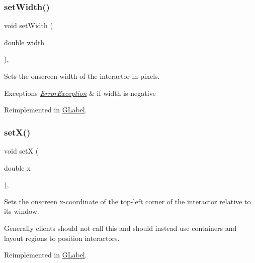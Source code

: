 \mbox{\label{classGInteractor_aa3f3fba4cb131baa8696ba01e3bceca1}} 
\subsubsection{\texorpdfstring{set\+Width()}{setWidth()}}
{\footnotesize\ttfamily void set\+Width (\begin{DoxyParamCaption}\item[{double}]{width }\end{DoxyParamCaption})\hspace{0.3cm}{\ttfamily [virtual]}, {\ttfamily [inherited]}}



Sets the onscreen width of the interactor in pixels. 


\begin{DoxyExceptions}{Exceptions}
{\em \mbox{\hyperlink{classErrorException}{Error\+Exception}}} & if width is negative \\
\hline
\end{DoxyExceptions}


Reimplemented in \mbox{\hyperlink{classGLabel_aca9b9c666c4162ab0a27a10530bc0762}{G\+Label}}.

\mbox{\label{classGInteractor_a9c18fcc579333bf9653d13ad2b372e39}} 
\subsubsection{\texorpdfstring{set\+X()}{setX()}}
{\footnotesize\ttfamily void setX (\begin{DoxyParamCaption}\item[{double}]{x }\end{DoxyParamCaption})\hspace{0.3cm}{\ttfamily [virtual]}, {\ttfamily [inherited]}}



Sets the onscreen x-\/coordinate of the top-\/left corner of the interactor relative to its window. 

Generally clients should not call this and should instead use containers and layout regions to position interactors. 

Reimplemented in \mbox{\hyperlink{classGLabel_af7260dc32f150e3a5072e7e8eb2628b1}{G\+Label}}.

